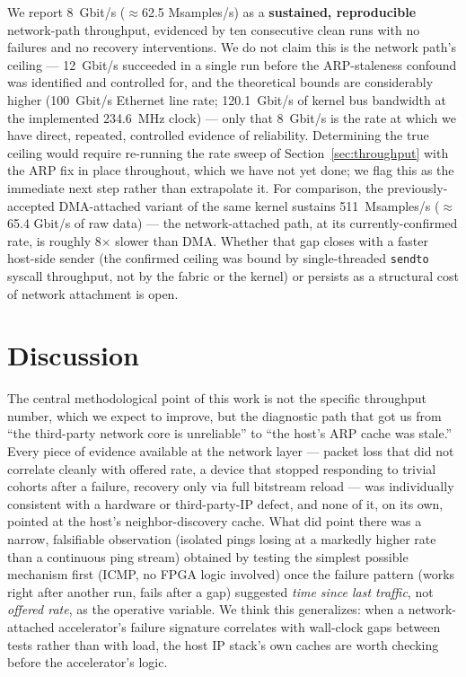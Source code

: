 \documentclass[11pt,a4paper]{article}
\newcommand{\code}[1]{\texttt{#1}}
\begin{document}
We report 8~Gbit/s ($\approx$62.5 Msamples/s) as a \textbf{sustained,
reproducible} network-path throughput, evidenced by ten consecutive
clean runs with no failures and no recovery interventions. We do not
claim this is the network path's ceiling --- 12~Gbit/s succeeded in a
single run before the ARP-staleness confound was identified and
controlled for, and the theoretical bounds are considerably higher
(100~Gbit/s Ethernet line rate; 120.1~Gbit/s of kernel bus bandwidth at
the implemented 234.6~MHz clock) --- only that 8~Gbit/s is the rate at
which we have direct, repeated, controlled evidence of reliability.
Determining the true ceiling would require re-running the rate sweep of
Section~\ref{sec:throughput} with the ARP fix in place throughout, which
we have not yet done; we flag this as the immediate next step rather
than extrapolate it. For comparison, the previously-accepted
DMA-attached variant of the same kernel sustains 511~Msamples/s
($\approx$65.4 Gbit/s of raw data) --- the network-attached path, at its
currently-confirmed rate, is roughly 8$\times$ slower than DMA. Whether
that gap closes with a faster host-side sender (the confirmed ceiling
was bound by single-threaded \code{sendto} syscall throughput, not by
the fabric or the kernel) or persists as a structural cost of network
attachment is open.

\section{Discussion}

The central methodological point of this work is not the specific
throughput number, which we expect to improve, but the diagnostic path
that got us from ``the third-party network core is unreliable'' to
``the host's ARP cache was stale.'' Every piece of evidence available at
the network layer --- packet loss that did not correlate cleanly with
offered rate, a device that stopped responding to trivial cohorts after
a failure, recovery only via full bitstream reload --- was individually
consistent with a hardware or third-party-IP defect, and none of it, on
its own, pointed at the host's neighbor-discovery cache. What did point
there was a narrow, falsifiable observation (isolated pings losing at a
markedly higher rate than a continuous ping stream) obtained by testing
the simplest possible mechanism first (ICMP, no FPGA logic involved)
once the failure pattern (works right after another run, fails after a
gap) suggested \emph{time since last traffic}, not \emph{offered rate},
as the operative variable. We think this generalizes: when a
network-attached accelerator's failure signature correlates with
wall-clock gaps between tests rather than with load, the host IP
stack's own caches are worth checking before the accelerator's logic.
\end{document}
